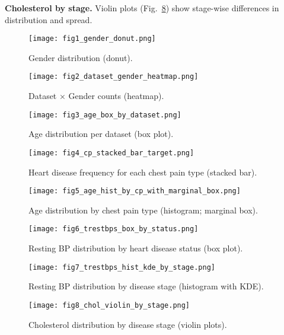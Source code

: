 \documentclass[conference]{IEEEtran}
\begin{document}
\textbf{Cholesterol by stage.} Violin plots (Fig.~\ref{fig:cholvio}) show stage-wise differences in distribution and spread.

\begin{figure}[!t]
  \centering
  \texttt{[image: fig1\_gender\_donut.png]}
  \caption{Gender distribution (donut).}
  \label{fig:gender}
\end{figure}

\begin{figure}[!t]
  \centering
  \texttt{[image: fig2\_dataset\_gender\_heatmap.png]}
  \caption{Dataset $\times$ Gender counts (heatmap).}
  \label{fig:heatmap}
\end{figure}

\begin{figure}[!t]
  \centering
  \texttt{[image: fig3\_age\_box\_by\_dataset.png]}
  \caption{Age distribution per dataset (box plot).}
  \label{fig:agebox}
\end{figure}

\begin{figure}[!t]
  \centering
  \texttt{[image: fig4\_cp\_stacked\_bar\_target.png]}
  \caption{Heart disease frequency for each chest pain type (stacked bar).}
  \label{fig:cpstack}
\end{figure}

\begin{figure}[!t]
  \centering
  \texttt{[image: fig5\_age\_hist\_by\_cp\_with\_marginal\_box.png]}
  \caption{Age distribution by chest pain type (histogram; marginal box).}
  \label{fig:agecp}
\end{figure}

\begin{figure}[!t]
  \centering
  \texttt{[image: fig6\_trestbps\_box\_by\_status.png]}
  \caption{Resting BP distribution by heart disease status (box plot).}
  \label{fig:bpbox}
\end{figure}

\begin{figure}[!t]
  \centering
  \texttt{[image: fig7\_trestbps\_hist\_kde\_by\_stage.png]}
  \caption{Resting BP distribution by disease stage (histogram with KDE).}
  \label{fig:bphist}
\end{figure}

\begin{figure}[!t]
  \centering
  \texttt{[image: fig8\_chol\_violin\_by\_stage.png]}
  \caption{Cholesterol distribution by disease stage (violin plots).}
  \label{fig:cholvio}
\end{figure}
\end{document}
